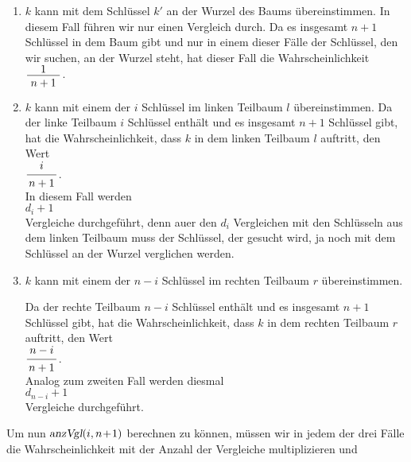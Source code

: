 \begin{enumerate}
\item $k$ kann mit dem Schl\"ussel $k'$ an der Wurzel des Baums \"ubereinstimmen.
      In diesem Fall f\"uhren wir nur einen Vergleich durch.  Da es insgesamt
      $n+1$ Schl\"ussel in dem Baum gibt und nur in einem dieser F\"alle
      der Schl\"ussel, den wir suchen, an der Wurzel steht, hat dieser Fall die
      Wahrscheinlichkeit
      \\[0.2cm]
      \hspace*{1.3cm} $\bruch{1}{\,n+1\,}$.

\item $k$ kann mit einem der $i$ Schl\"ussel im linken Teilbaum $l$ \"ubereinstimmen.
      Da  der linke Teilbaum $i$ Schl\"ussel enth\"alt und  es insgesamt
      $n+1$ Schl\"ussel gibt, hat die Wahrscheinlichkeit, dass $k$ in dem linken Teilbaum $l$
      auftritt, den Wert \\[0.2cm]
      \hspace*{1.3cm} $\displaystyle\bruch{i}{n+1}$. \\[0.2cm]
       In diesem Fall werden \\[0.2cm]
      \hspace*{1.3cm} $\displaystyle d_i + 1$ \\[0.2cm]
      Vergleiche durchgef\"uhrt, denn au\3er den $d_i$ Vergleichen mit den Schl\"usseln aus dem
      linken Teilbaum muss der Schl\"ussel, der gesucht wird, ja noch mit dem Schl\"ussel an
      der Wurzel verglichen werden.
\item $k$ kann mit einem der $n-i$ Schl\"ussel im rechten Teilbaum $r$ \"ubereinstimmen.

      Da  der rechte Teilbaum $n-i$ Schl\"ussel enth\"alt und  es insgesamt
      $n+1$ Schl\"ussel gibt, hat die Wahrscheinlichkeit, dass $k$ in dem rechten Teilbaum $r$
      auftritt, den Wert \\[0.2cm]
      \hspace*{1.3cm} $\displaystyle \bruch{n-i}{n+1}$. \\[0.2cm]
      Analog zum zweiten Fall werden diesmal \\[0.2cm]
      \hspace*{1.3cm} $\displaystyle d_{n-i} + 1$ \\[0.2cm]
      Vergleiche durchgef\"uhrt. 
\end{enumerate}
Um nun  $\textsl{anzVgl}(i, n\!+\!1)$ berechnen zu k\"onnen, m\"ussen wir in jedem der drei
F\"alle die Wahrscheinlichkeit mit der Anzahl der Vergleiche multiplizieren und
